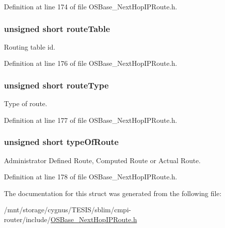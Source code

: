 Definition at line 174 of file OSBase\_\-NextHopIPRoute.h.\hypertarget{structnext_hop_i_p_a5238a1e177a50a51c5fd346af46505c3}{
\subsubsection[{routeTable}]{\setlength{\rightskip}{0pt plus 5cm}unsigned short {\bf routeTable}}}
\label{structnext_hop_i_p_a5238a1e177a50a51c5fd346af46505c3}
Routing table id. 

Definition at line 176 of file OSBase\_\-NextHopIPRoute.h.\hypertarget{structnext_hop_i_p_ae54e153a6448e2a1c78aae45a335f646}{
\subsubsection[{routeType}]{\setlength{\rightskip}{0pt plus 5cm}unsigned short {\bf routeType}}}
\label{structnext_hop_i_p_ae54e153a6448e2a1c78aae45a335f646}
Type of route. 

Definition at line 177 of file OSBase\_\-NextHopIPRoute.h.\hypertarget{structnext_hop_i_p_a8aba433e1b002b6710551fc1c35ad0ef}{
\subsubsection[{typeOfRoute}]{\setlength{\rightskip}{0pt plus 5cm}unsigned short {\bf typeOfRoute}}}
\label{structnext_hop_i_p_a8aba433e1b002b6710551fc1c35ad0ef}
Administrator Defined Route, Computed Route or Actual Route. 

Definition at line 178 of file OSBase\_\-NextHopIPRoute.h.

The documentation for this struct was generated from the following file:\begin{DoxyCompactItemize}
\item 
/mnt/storage/cygnus/TESIS/sblim/cmpi-\/router/include/\hyperlink{_o_s_base___next_hop_i_p_route_8h}{OSBase\_\-NextHopIPRoute.h}\end{DoxyCompactItemize}
